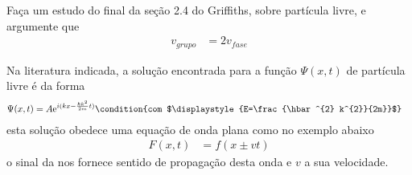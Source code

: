 \begin{prob}
	Faça um estudo do final  da seção  2.4 do Griffiths, sobre partícula livre, e argumente  que
	\begin{align}
		v_{grupo}	&= 2v_{fase}
	\end{align}
	\begin{sol}
		Na literatura indicada, a solução encontrada para a função $\Psi(x,t)$ de partícula livre é da forma
		\begin{align}
			\label{eq:p08-principal}
			\Psi(x,t) &= A \mathrm{e}^{i(kx-\frac{\hbar k^{2}}{2m}t)}\condition{com $\displaystyle{E=\frac{\hbar^{2} k^{2}}{2m}}$}
		\end{align}
		esta solução obedece uma equação de onda plana como no exemplo abaixo
		\begin{align}
			F(x,t) &= f(x\pm vt)
		\end{align}
		o sinal da nos fornece sentido de propagação desta onda e $v$ a sua velocidade.


\end{sol}
\end{prob}
